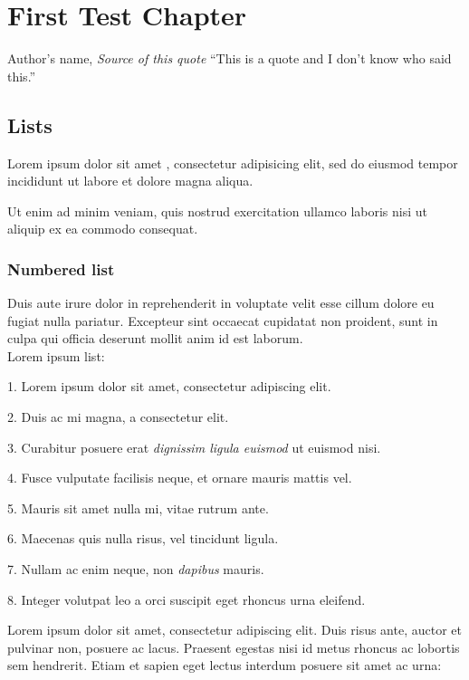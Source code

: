 \chapter{First Test Chapter}

\begin{chapquote}{Author's name, \textit{Source of this quote}}
    ``This is a quote and I don't know who said this.''
\end{chapquote}
    
\section{Lists}
Lorem ipsum dolor sit amet \citep{Ohno2007}, consectetur adipisicing elit, sed do eiusmod tempor incididunt ut labore et dolore magna aliqua.

Ut enim ad minim veniam, quis nostrud exercitation ullamco laboris nisi ut aliquip ex ea commodo consequat. 

\subsection{Numbered list}
Duis aute irure dolor in reprehenderit in voluptate velit esse cillum dolore eu fugiat nulla pariatur. Excepteur sint occaecat cupidatat non proident, sunt in culpa qui officia deserunt mollit anim id est laborum. \\ Lorem ipsum list:

1. Lorem ipsum dolor sit amet, consectetur adipiscing elit.

2. Duis ac mi magna, a consectetur elit.

3. Curabitur posuere erat \emph{dignissim ligula euismod} ut euismod nisi.

4. Fusce vulputate facilisis neque, et ornare mauris mattis vel.

5. Mauris sit amet nulla mi, vitae rutrum ante.

6. Maecenas quis nulla risus, vel tincidunt ligula.

7. Nullam ac enim neque, non \emph{dapibus} mauris.

8. Integer volutpat leo a orci suscipit eget rhoncus urna eleifend.

\noindent Lorem ipsum dolor sit amet, consectetur adipiscing elit. Duis risus ante, auctor et pulvinar non, posuere ac lacus. Praesent egestas nisi id metus rhoncus ac lobortis sem hendrerit. Etiam et sapien eget lectus interdum posuere sit amet ac urna:

